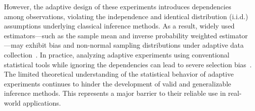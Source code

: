 \documentclass[12pt]{article}
\begin{document}
However, the adaptive design of these experiments introduces dependencies among observations, violating the independence and identical distribution (i.i.d.) assumptions underlying classical inference methods. As a result, widely used estimators—such as the sample mean and inverse probability weighted estimator—may exhibit bias and non-normal sampling distributions under adaptive data collection~\citep{bowden2017unbiased,shin2019sample,Hadad2021,shin2021bias}. In practice, analyzing adaptive experiments using conventional statistical tools while ignoring the dependencies 
can lead to severe selection bias~\citep{dwork2015reusable}. The limited theoretical understanding of the statistical behavior of adaptive experiments continues to hinder the development of valid and generalizable inference methods. This represents a major barrier to their reliable use in real-world applications.
\end{document}
